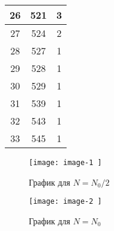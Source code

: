\begin{center}
\begin{longtable}{|c|c|c|}
		26  & 521           & 3          \\ \hline
		27  & 524           & 2          \\ \hline
		28  & 527           & 1          \\ \hline
		29  & 528           & 1          \\ \hline
		30  & 529           & 1          \\ \hline
		31  & 539           & 1          \\ \hline
		32  & 543           & 1          \\ \hline
		33  & 545           & 1          \\ \hline
	\end{longtable}
\end{center}


\begin{figure}[t]
	\caption{График для $N = N_0/2$}
	\texttt{[image:  image-1 ]}
	\centering
\end{figure}

\begin{figure}[b]
	\caption{График для $N = N_0$}
	\texttt{[image:  image-2 ]}
	\centering
\end{figure}
